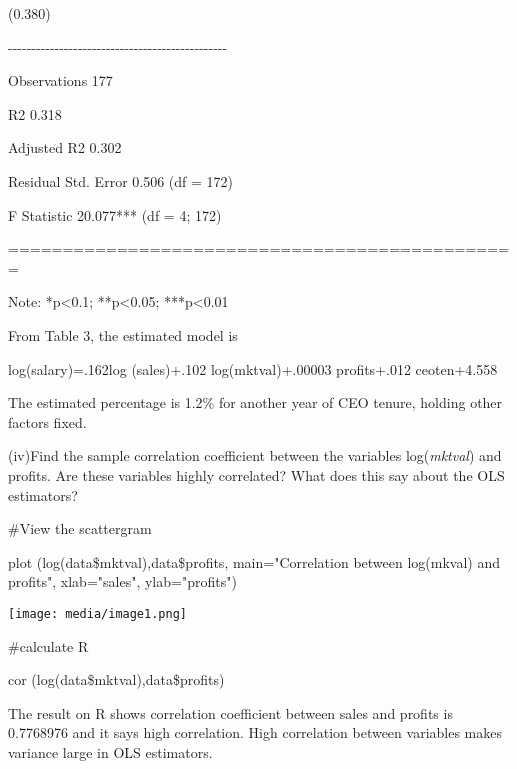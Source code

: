 \documentclass[
]{article}
\begin{document}
(0.380)

-\/-\/-\/-\/-\/-\/-\/-\/-\/-\/-\/-\/-\/-\/-\/-\/-\/-\/-\/-\/-\/-\/-\/-\/-\/-\/-\/-\/-\/-\/-\/-\/-\/-\/-\/-\/-\/-\/-\/-\/-\/-\/-\/-\/-\/-\/-

Observations 177

R2 0.318

Adjusted R2 0.302

Residual Std. Error 0.506 (df = 172)

F Statistic 20.077*** (df = 4; 172)

===============================================

Note: *p\textless0.1; **p\textless0.05; ***p\textless0.01

From Table 3, the estimated model is

log(salary)=.162log (sales)+.102 log(mktval)+.00003 profits+.012
ceoten+4.558

The estimated percentage is 1.2\% for another year of CEO tenure,
holding other factors fixed.

(iv)Find the sample correlation coefficient between the variables
log(\emph{mktval}) and profits. Are these variables highly correlated?
What does this say about the OLS estimators?

\#View the scattergram

plot (log(data\$mktval),data\$profits, main="Correlation between
log(mkval) and profits", xlab="sales", ylab="profits")

\texttt{[image: media/image1.png]}

\#calculate R

cor (log(data\$mktval),data\$profits)

The result on R shows correlation coefficient between sales and profits
is 0.7768976 and it says high correlation. High correlation between
variables makes variance large in OLS estimators.
\end{document}
